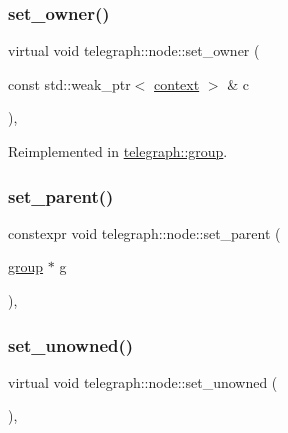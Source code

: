 \mbox{\label{classtelegraph_1_1node_a6d864584bfadd3520194066f8b62812b}} 
\subsubsection{\texorpdfstring{set\+\_\+owner()}{set\_owner()}}
{\footnotesize\ttfamily virtual void telegraph\+::node\+::set\+\_\+owner (\begin{DoxyParamCaption}\item[{const std\+::weak\+\_\+ptr$<$ \hyperlink{classtelegraph_1_1context}{context} $>$ \&}]{c }\end{DoxyParamCaption})\hspace{0.3cm}{\ttfamily [inline]}, {\ttfamily [virtual]}}



Reimplemented in \hyperlink{classtelegraph_1_1group_ae4887f80cadba073aef9feef1295fb20}{telegraph\+::group}.

\mbox{\label{classtelegraph_1_1node_ae0f1bd6f97ea3e1f21940a7eebb70fab}} 
\subsubsection{\texorpdfstring{set\+\_\+parent()}{set\_parent()}}
{\footnotesize\ttfamily constexpr void telegraph\+::node\+::set\+\_\+parent (\begin{DoxyParamCaption}\item[{\hyperlink{classtelegraph_1_1group}{group} $\ast$}]{g }\end{DoxyParamCaption})\hspace{0.3cm}{\ttfamily [inline]}, {\ttfamily [protected]}}

\mbox{\label{classtelegraph_1_1node_ac0bbcb9d810a2cca87b120301c0972a0}} 
\subsubsection{\texorpdfstring{set\+\_\+unowned()}{set\_unowned()}}
{\footnotesize\ttfamily virtual void telegraph\+::node\+::set\+\_\+unowned (\begin{DoxyParamCaption}{ }\end{DoxyParamCaption})\hspace{0.3cm}{\ttfamily [inline]}, {\ttfamily [virtual]}}



